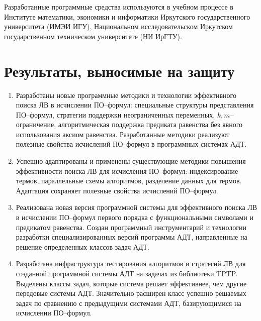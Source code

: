 Разработанные программные средства используются в учебном процессе в Институте математики, экономики и информатики Иркутского государственного университета (ИМЭИ ИГУ), Национальном исследовательском Иркутском государственном техническом университете (НИ ИрГТУ).  %



\section*{Результаты, выносимые на защиту}
\begin{enumerate}
\item Разработаны новые программные методики и технологии эффективного поиска ЛВ в исчислении ПО--формул: специальные структуры представления ПО--формул, стратегии поддержки неограниченных переменных, $k,m$--огра\-ни\-че\-ние, алгоритмическая поддержка предиката равенства без явного использования аксиом равенства. Разработанные методики реализуют полезные свойства исчислений ПО--формул в программных системах АДТ.

\item Успешно адаптированы и применены существующие методики повышения эффективности поиска ЛВ для исчисления ПО--формул: индексирование термов, параллельные схемы алгоритмов, разделение данных для термов. Адаптация сохраняет полезные свойства исчислений ПО--формул.

\item Реализована новая версия программной системы для эффективного поиска ЛВ в исчислении ПО--формул первого порядка с функциональными символами и предикатом равенства. Создан программный инструментарий и технологии разработки специализированных версий программы АДТ, направленные на решение определенных классов задач АДТ. %

\item Разработана инфраструктура тестирования алгоритмов и стратегий ЛВ для созданной программной системы АДТ на задачах из библиотеки TPTP. Выделены классы задач, которые система решает эффективнее, чем другие передовые системы АДТ. Значительно расширен класс успешно решаемых задач по сравнению с предыдущими системами АДТ, базирующимися на исчислении ПО--формул.
\end{enumerate}



